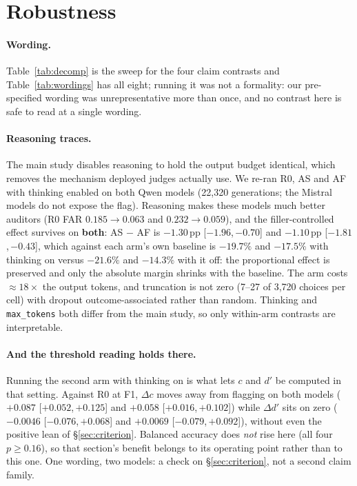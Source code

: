 \documentclass[11pt]{article}
\newcommand{\pp}{\,\text{pp}}
\newcommand{\ci}[2]{{\footnotesize[$#1$,\,$#2$]}}
\begin{document}
\section{Robustness}
\label{sec:robustness}

\paragraph{Wording.}
Table~\ref{tab:decomp} is the sweep for the four claim contrasts and
Table~\ref{tab:wordings} has all eight; running it was not a formality: our
pre-specified wording was unrepresentative more than once, and no contrast here is safe to read at a
single wording.

\paragraph{Reasoning traces.}
The main study disables reasoning to hold the output budget identical, which removes the mechanism
deployed judges actually use. We re-ran R0, AS and AF with thinking enabled on both Qwen
models (22{,}320 generations; the Mistral models do not expose the flag). Reasoning makes these
models much better auditors (R0 FAR $0.185\!\rightarrow\!0.063$ and $0.232\!\rightarrow\!0.059$), and
the filler-controlled effect survives on \textbf{both}: AS $-$ AF is $-1.30\pp$ \ci{-1.96}{-0.70} and
$-1.10\pp$ \ci{-1.81}{-0.43}, which against each arm's own baseline is $-19.7\%$ and $-17.5\%$ with
thinking on versus $-21.6\%$ and $-14.3\%$ with it off: the proportional effect is preserved and only
the absolute margin shrinks with the baseline. The arm costs $\approx18\times$ the output tokens, and
truncation is not zero (7--27 of 3{,}720 choices per cell) with dropout outcome-associated rather than
random. Thinking and \texttt{max\_tokens} both differ from the main study, so only within-arm
contrasts are interpretable.

\paragraph{And the threshold reading holds there.}
Running the second arm with thinking on is what lets $c$ and $d'$ be computed in that setting. Against
R0 at F1, $\Delta c$ moves away from flagging on both models ($+0.087$ \ci{+0.052}{+0.125} and
$+0.058$ \ci{+0.016}{+0.102}) while $\Delta d'$ sits on zero ($-0.0046$ \ci{-0.076}{+0.068} and
$+0.0069$ \ci{-0.079}{+0.092}), without even the positive lean of \S\ref{sec:criterion}. Balanced
accuracy does \emph{not} rise here (all four $p \ge 0.16$), so that section's benefit belongs to its
operating point rather than to this one. One wording, two models: a check on \S\ref{sec:criterion},
not a second claim family.
\end{document}
